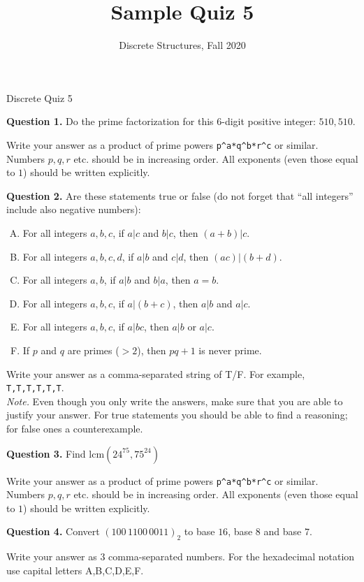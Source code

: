 \documentclass[jou]{apa6}
\title{Sample Quiz 5}
\author{Discrete Structures, Fall 2020}
\affiliation{RBS}
\begin{document}
\thispagestyle{empty}

\twocolumn
{\Large Discrete Quiz 5}

\vspace{6pt}
{\bf Question 1.} Do the prime factorization for this 6-digit positive integer: 
$510,510$. 

Write your answer as a product of prime powers {\tt p\^{}a*q\^{}b*r\^{}c} or similar. 
Numbers $p,q,r$ etc. should be in increasing order. All exponents (even those equal to $1$) should be written explicitly.


\vspace{6pt}
{\bf Question 2.} Are these statements true or false (do not forget that ``all integers'' include also negative numbers):
\begin{enumerate}[(A)] 
\item For all integers $a,b,c$, if $a|c$ and $b|c$, then $(a + b)|c$.
\item For all integers $a,b,c,d$, if $a|b$ and $c|d$, then $(ac)|(b + d)$.
\item For all integers $a,b$, if $a|b$ and $b|a$, then $a = b$.
\item For all integers $a,b,c$, if $a|(b + c)$, then $a|b$ and $a|c$.
\item For all integers $a,b,c$, if $a|bc$, then $a|b$ or $a|c$.
\item If $p$ and $q$ are primes ($> 2$), then $pq + 1$ is never prime.
\end{enumerate}

Write your answer as a comma-separated string of T/F. For example, {\tt T,T,T,T,T,T}.\\
{\em Note.} Even though you only write the answers, 
make sure that you are able to justify your answer. For true statements you should be able to 
find a reasoning; for false ones \textendash{} a counterexample. 


\vspace{6pt}
{\bf Question 3.} Find $\text{lcm}(24^{75},75^{24})$ 

Write your answer as a product of prime powers {\tt p\^{}a*q\^{}b*r\^{}c} or similar. 
Numbers $p,q,r$ etc. should be in increasing order. All exponents (even those equal to $1$) should be written explicitly.


\vspace{6pt}
{\bf Question 4.}
Convert $(100\,1100\,0011)_2$ to base $16$, base $8$ and base $7$. 

Write your answer as $3$ comma-separated numbers. For the hexadecimal notation use capital letters A,B,C,D,E,F.
\end{document}
